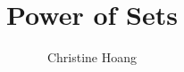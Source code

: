 \documentclass{article}
\title{Power of Sets}
\author{Christine Hoang}
\begin{document}
\maketitle

\section{}
\end{document}

